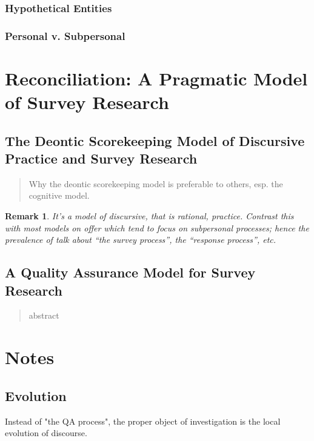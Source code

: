 \documentclass[11pt,twoside]{article}
\newtheorem{remark}{Remark}
\newcommand{\SR}{Survey Research}
\begin{document}
\subsubsection{Hypothetical Entities}

\subsubsection{Personal v. Subpersonal}

\section{Reconciliation: A Pragmatic Model of Survey Research}

\subsection{The Deontic Scorekeeping Model of Discursive Practice and \SR{}}

\begin{abstract}
Why the deontic scorekeeping model is preferable to others, esp. the
cognitive model.
\end{abstract}

\begin{remark}
  It's a model of discursive, that is rational, practice.  Contrast
  this with most models on offer which tend to focus on subpersonal
  processes; hence the prevalence of talk about ``the survey
  process'', the ``response process'', etc.
\end{remark}

\subsection{A Quality Assurance Model for \SR{}}

\begin{abstract}
abstract
\end{abstract}

\section{Notes}

\subsection{Evolution}

Instead of "the QA process", the proper object of investigation is the
local evolution of discourse.
\end{document}
